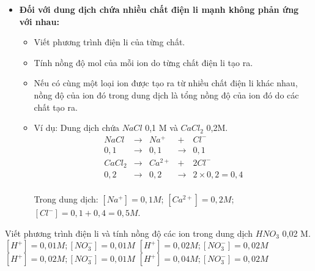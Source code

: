 \begin{phuongphap}
\begin{itemize}
\begin{itemize}
\[\begin{array}{ccccl}
					Al_2{SO_4}_3 & \rightarrow  & 2Al^{3+}  & + &3{SO_4}^{2-} \\
					0{,}1        & \rightarrow & 0{,}2      & \rightarrow& 0{,}3 \; \text{(mol/L)}
				\end{array}
				\]
	            \\ Vậy $[Al^{3+}] = 0{,}2 M$; $[SO_4^{2-}] = 0{,}3 M$.
	        \end{itemize}
    \item \textbf{Đối với dung dịch chứa nhiều chất điện li mạnh không phản ứng với nhau:}
        \begin{itemize}
	            \item Viết phương trình điện li của từng chất.
	            \item Tính nồng độ mol của mỗi ion do từng chất điện li tạo ra.
	            \item Nếu có cùng một loại ion được tạo ra từ nhiều chất điện li khác nhau, nồng độ của ion đó trong dung dịch là tổng nồng độ của ion đó do các chất tạo ra.
	            \item Ví dụ: Dung dịch chứa $NaCl$ 0,1 M và $CaCl_2$ 0,2M.
	                \[
	                \begin{array}{lclcl}
	                	NaCl   & \rightarrow & Na^+        & + & Cl^- \\
	                	0,1    & \rightarrow & 0,1         &\rightarrow& 0,1 \\[1em]
	                	CaCl_2 & \rightarrow & Ca^{2+}     & + & 2Cl^- \\
	                	0,2    & \rightarrow & 0,2         &\rightarrow& 2 \times 0,2 = 0,4
	                \end{array}
	                \]
	            \\ Trong dung dịch: $[Na^+] = 0,1 M$; $[Ca^{2+}] = 0,2 M$; $[Cl^-] = 0,1 + 0,4 = 0,5 M$.
	        \end{itemize}
\end{itemize}
\end{phuongphap}
%
\begin{vd}
	Viết phương trình điện li và tính nồng độ các ion trong dung dịch $HNO_3$ 0,02 M.
	\choice
	{$[H^+] = 0,01 M; [NO_3^-] = 0,01 M$}
	{\True $[H^+] = 0,02 M; [NO_3^-] = 0,02 M$}
	{$[H^+] = 0,02 M; [NO_3^-] = 0,01 M$}
	{$[H^+] = 0,04 M; [NO_3^-] = 0,02 M$}
\end{vd}

